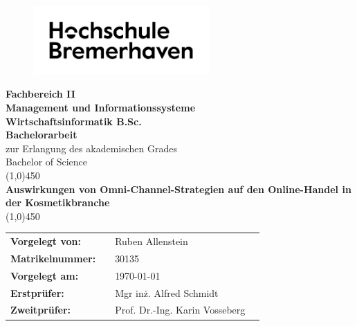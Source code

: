 
\thispagestyle{empty}
\begin{figure}[h!]
 \centering
 \includegraphics[width=0.6\textwidth]{src/abbildungen/logo.png}
\end{figure}
\begin{center}
\large\textbf{Fachbereich II \\ Management und Informationssysteme}\\
\large\textbf{Wirtschaftsinformatik B.Sc.}\\
\vspace{1cm}
\LARGE\textbf{Bachelorarbeit}\\
\large{zur Erlangung des akademischen Grades \\ Bachelor of Science}\\
\vspace*{\fill}
\line(1,0){450}\\
\doublespacing
\textbf{\Large{Auswirkungen von Omni-Channel-Strategien auf den Online-Handel in der Kosmetikbranche}}\\
\line(1,0){450}\\
\end{center}
\vspace*{\fill}
\onehalfspacing
\begin{flushleft}
\begin{tabular}{llll}
\textbf{Vorgelegt von:} & & Ruben Allenstein & \\
\textbf{Matrikelnummer:} & & 30135 & \\
\textbf{Vorgelegt am:} & & \today &\\
\textbf{Erstprüfer:} & & Mgr inż. Alfred Schmidt & \\
\textbf{Zweitprüfer:} & & Prof. Dr.-Ing. Karin Vosseberg &\\
\end{tabular}
\end{flushleft}
